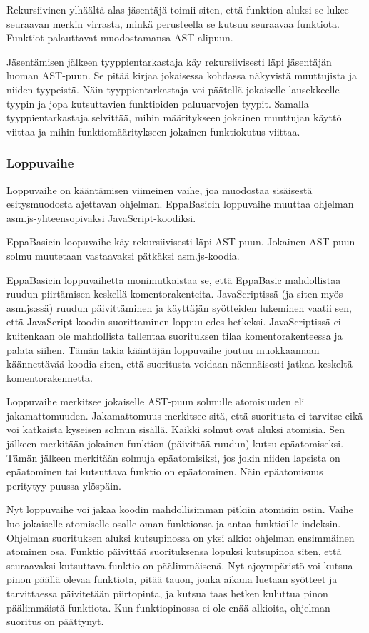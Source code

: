 Rekursiivinen ylhäältä-alas-jäsentäjä
toimii siten, että funktion aluksi
se lukee seuraavan merkin virrasta,
minkä perusteella se kutsuu seuraavaa
funktiota.
Funktiot palauttavat muodostamansa
AST-alipuun.

Jäsentämisen jälkeen tyyppientarkastaja
käy rekursiivisesti läpi jäsentäjän
luoman AST-puun.
Se pitää kirjaa jokaisessa kohdassa
näkyvistä muuttujista ja niiden tyypeistä.
Näin tyyppientarkastaja voi päätellä
jokaiselle lausekkeelle tyypin
ja jopa kutsuttavien funktioiden
paluuarvojen tyypit.
Samalla tyyppientarkastaja selvittää,
mihin määritykseen jokainen muuttujan
käyttö viittaa ja mihin funktiomääritykseen
jokainen funktiokutus viittaa.

\subsubsection{Loppuvaihe}
Loppuvaihe on kääntämisen viimeinen vaihe,
joa muodostaa sisäisestä esitysmuodosta
ajettavan ohjelman.
EppaBasicin loppuvaihe muuttaa ohjelman
asm.js-yhteensopivaksi \cite{asm.js}
JavaScript-koodiksi.

EppaBasicin loopuvaihe käy rekursiivisesti
läpi AST-puun.
Jokainen AST-puun solmu muutetaan
vastaavaksi pätkäksi asm.js-koodia.

EppaBasicin loppuvaihetta monimutkaistaa se,
että EppaBasic mahdollistaa ruudun piirtämisen
keskellä komentorakenteita.
JavaScriptissä (ja siten myös asm.js:ssä)
ruudun päivittäminen ja käyttäjän syötteiden
lukeminen vaatii sen, että JavaScript-koodin
suorittaminen loppuu edes hetkeksi.
JavaScriptissä ei kuitenkaan ole
mahdollista tallentaa suorituksen tilaa
komentorakenteessa ja palata siihen.
Tämän takia kääntäjän loppuvaihe
joutuu muokkaamaan käännettävää
koodia siten, että suoritusta
voidaan näennäisesti jatkaa
keskeltä komentorakennetta.

Loppuvaihe merkitsee jokaiselle
AST-puun solmulle atomisuuden
eli jakamattomuuden.
Jakamattomuus merkitsee sitä,
että suoritusta ei tarvitse eikä voi
katkaista kyseisen solmun sisällä.
Kaikki solmut ovat aluksi atomisia.
Sen jälkeen merkitään jokainen
funktion  (päivittää ruudun)
kutsu epäatomiseksi.
Tämän jälkeen merkitään solmuja
epäatomisiksi, jos jokin niiden
lapsista on epäatominen tai
kutsuttava funktio on epäatominen.
Näin epäatomisuus peritytyy
puussa ylöspäin.

Nyt loppuvaihe voi jakaa koodin
mahdollisimman pitkiin atomisiin osiin.
Vaihe luo jokaiselle atomiselle osalle oman
funktionsa ja antaa funktioille indeksin.
Ohjelman suorituksen aluksi kutsupinossa
on yksi alkio: ohjelman ensimmäinen
atominen osa.
Funktio päivittää suorituksensa
lopuksi kutsupinoa siten,
että seuraavaksi kutsuttava
funktio on päälimmäisenä.
Nyt ajoympäristö voi kutsua
pinon päällä olevaa funktiota,
pitää tauon, jonka aikana
luetaan syötteet ja tarvittaessa
päivitetään piirtopinta,
ja kutsua taas hetken kuluttua
pinon päälimmäistä funktiota.
Kun funktiopinossa ei ole
enää alkioita, ohjelman suoritus
on päättynyt.

